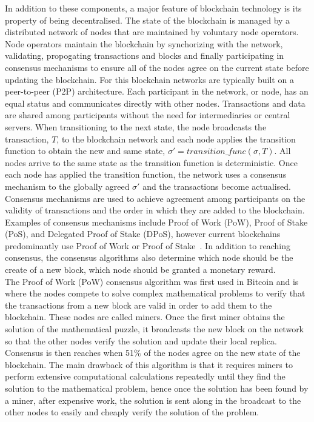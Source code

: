 \noindent In addition to these components, a major feature of blockchain technology is its property of being decentralised. The state of the blockchain is managed by a distributed network of nodes that are maintained by voluntary node operators. Node operators maintain the blockchain by synchorizing with the network, validating, propogating transactions and blocks and finally participating in consensus mechanisms to ensure all of the nodes agree on the current state before updating the blockchain. For this blockchain networks are typically built on a peer-to-peer (P2P) architecture. Each participant in the network, or node, has an equal status and communicates directly with other nodes. Transactions and data are shared among participants without the need for intermediaries or central servers. When transitioning to the next state, the node broadcasts the transaction, $T$, to the blockchain network and each node applies the transition function to obtain the new and same state, $\sigma' = transition\_func(\sigma, T)$. All nodes arrive to the same state as the transition function is deterministic. Once each node has applied the transition function, the network uses a consensus mechanism to the globally agreed $\sigma'$ and the transactions become actualised.
\\[5mm]
Consensus mechanisms are used to achieve agreement among participants on the validity of transactions and the order in which they are added to the blockchain. Examples of consensus mechanisms include Proof of Work (PoW), Proof of Stake (PoS), and Delegated Proof of Stake (DPoS), however current blockchains predominantly use Proof of Work or Proof of Stake~\cite{noauthor_consensus_nodate}. In addition to reaching consensus, the consensus algorithms also determine which node should be the create of a new block, which node should be granted a monetary reward.
\\[5mm]
The Proof of Work (PoW) consensus algorithm was first used in Bitcoin and is where the nodes compete to solve complex mathematical problems to verify that the transactions from a new block are valid in order to add them to the blockchain. These nodes are called miners. Once the first miner obtains the solution of the mathematical puzzle, it broadcasts the new block on the network so that the other nodes verify the solution and update their local replica. Consensus is then reaches when 51\% of the nodes agree on the new state of the blockchain. The main drawback of this algorithm is that it requires miners to perform extensive computational calculations repeatedly until they find the solution to the mathematical problem, hence once the solution has been found by a miner, after expensive work, the solution is sent along in the broadcast to the other nodes to easily and cheaply verify the solution of the problem.
